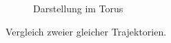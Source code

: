 \begin{figure}
\begin{subfigure}[b]{0.49\textwidth}
                \caption{Darstellung im Torus}
                \label{fig:vergleich_torus}
        \end{subfigure}
        \caption{Vergleich zweier gleicher Trajektorien.}
        \label{fig:vergleich_systeme}
\end{figure}

